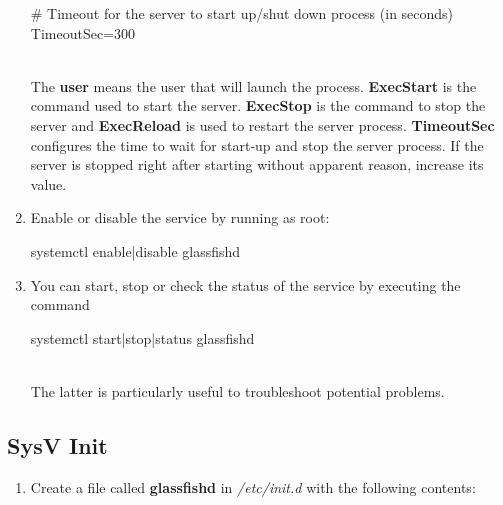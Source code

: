 \documentclass[a4paper]{article}
\begin{document}
\begin{appendices}
\begin{enumerate}
\begin{verbbox}
						# Timeout for the server to start up/shut down process (in seconds)
						TimeoutSec=300
					\end{verbbox}
					\begin{figure}[ht]
						\centering	
						\theverbbox
					\end{figure}\\
					The \textbf{user} means the user that will launch the process. \textbf{ExecStart} is the command used to start the server. \textbf{ExecStop} is the command to stop the server and \textbf{ExecReload} is used to restart the server process. \textbf{TimeoutSec} configures the time to wait for start-up and stop the server process. If the server is stopped right after starting without apparent reason, increase its value.
					\item Enable or disable the service by running as root: 
					\begin{verbbox}
						systemctl enable|disable glassfishd
					\end{verbbox}
					\begin{figure}[ht]
						\centering	
						\theverbbox
					\end{figure}
					\item You can start, stop or check the status of the service by executing the command
					\begin{verbbox}
						systemctl start|stop|status glassfishd
					\end{verbbox}
					\begin{figure}[ht]
						\centering	
						\theverbbox
					\end{figure}\\
					The latter is particularly useful to troubleshoot potential problems.
				\end{enumerate}
				
				\newpage
				\subsection{SysV Init}
				\begin{enumerate}
					\item Create a file called \textbf{glassfishd} in \textit{/etc/init.d} with the following contents:
\end{enumerate}
\end{appendices}
\end{document}
